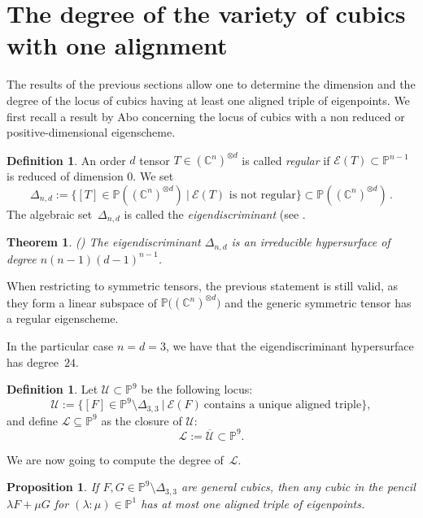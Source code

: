 \documentclass[11pt, a4paper, reqno, captions=tableheading,bibliography=totoc]{scrartcl}
\theoremstyle{plain}
\newtheorem{prop}[lemma]{Proposition}
\newtheorem{theorem}[lemma]{Theorem}
\theoremstyle{definition}
\newtheorem{definition}[lemma]{Definition}
\newcommand{\C}{\mathbb{C}}
\newcommand{\p}{\mathbb{P}}
\newcommand{\Eig}[1]{\mathcal{E}\!\left( {#1} \right)}
\begin{document}
\section{The degree of the variety of cubics with one alignment}
\label{degree}

The results of the previous sections allow one to determine the dimension and the degree of the locus of cubics having
at least one aligned triple of eigenpoints. We first recall a result by Abo concerning the locus of cubics with a non reduced or positive-dimensional eigenscheme.

\begin{definition}
An order $d$ tensor $T \in (\C^n)^{\otimes d}$ is called \emph{regular} if $\Eig{T} \subset \p^{n-1}$ is reduced of dimension $0$.
We set
%
\[
\Delta_{n,d}:=\{[T]\in \p ((\C^n)^{\otimes d}) \ | \ \Eig{T} \textrm{\ is \ not \ regular} \}\subset \p ((\C^n)^{\otimes d}) \,.
\]
%
The algebraic set~$\Delta_{n,d}$ is called the \emph{eigendiscriminant} (see \cite[Definition~5.5]{Abo}.
\end{definition}

\begin{theorem}(\cite[Corollary 5.8]{Abo})
The eigendiscriminant $\Delta_{n,d}$ is an irreducible hypersurface of degree $n(n-1)(d-1)^{n-1}$.
\end{theorem}

When restricting to symmetric tensors, the previous statement is still valid, as they form a linear subspace of
$\p \bigl((\C^n)^{\otimes d}\bigr)$ and the generic symmetric tensor has a regular eigenscheme.

In the particular case $n=d=3$, we have that the eigendiscriminant hypersurface has degree~$24$.

\begin{definition}
Let $\mathcal{U} \subset \p^9$ be the following locus:
%
\[
\mathcal{U} := \{[F]\in \p^9 \setminus \Delta_{3,3} \ | \ \Eig{F} \ \textrm {contains \ a \ unique \ aligned \ triple}\},
\]
%
and define $\mathcal{L} \subseteq \p^9$ as the closure of $\mathcal{U}$:
%
\[
 \mathcal{L} := \overline{\mathcal{U}} \subset \p^9.
\]
%
\end{definition}

We are now going to compute the degree of~$\mathcal{L}$.

\begin{prop}
 If $F, G \in \p^9 \setminus \Delta_{3,3}$ are general cubics, then any cubic in the pencil $\lambda F + \mu G$ for $(\lambda: \mu) \in \p^1$ has at most one aligned triple of eigenpoints.
\end{prop}
\end{document}
